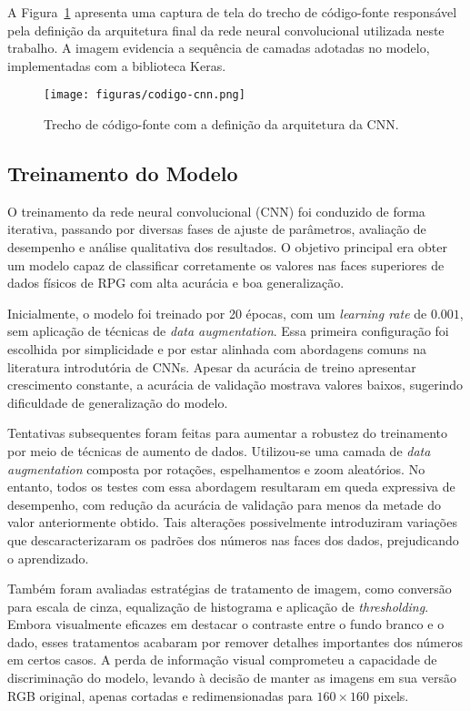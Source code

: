 A Figura~\ref{fig:codigo-cnn} apresenta uma captura de tela do trecho de código-fonte responsável 
pela definição da arquitetura final da rede neural convolucional utilizada neste trabalho. 
A imagem evidencia a sequência de camadas adotadas no modelo, implementadas com a biblioteca Keras.

\begin{figure}[H]
    \centering
    \texttt{[image: figuras/codigo-cnn.png]}
    \caption{Trecho de código-fonte com a definição da arquitetura da CNN.}
    \label{fig:codigo-cnn}
\end{figure}

\subsection{Treinamento do Modelo}

O treinamento da rede neural convolucional (CNN) foi conduzido de forma iterativa, passando por 
diversas fases de ajuste de parâmetros, avaliação de desempenho e análise qualitativa dos resultados. 
O objetivo principal era obter um modelo capaz de classificar corretamente os valores nas faces 
superiores de dados físicos de RPG com alta acurácia e boa generalização.

Inicialmente, o modelo foi treinado por 20 épocas, com um \textit{learning rate} de $0.001$, 
sem aplicação de técnicas de \textit{data augmentation}. Essa primeira configuração foi escolhida 
por simplicidade e por estar alinhada com abordagens comuns na literatura introdutória de CNNs.
Apesar da acurácia de treino apresentar crescimento constante, a acurácia de validação mostrava 
valores baixos, sugerindo dificuldade de generalização do modelo.

Tentativas subsequentes foram feitas para aumentar a robustez do treinamento por meio de técnicas 
de aumento de dados. Utilizou-se uma camada de \textit{data augmentation} composta por rotações, 
espelhamentos e zoom aleatórios. No entanto, todos os testes com essa abordagem resultaram em queda 
expressiva de desempenho, com redução da acurácia de validação para menos da metade do valor 
anteriormente obtido. Tais alterações possivelmente introduziram variações que descaracterizaram 
os padrões dos números nas faces dos dados, prejudicando o aprendizado.

Também foram avaliadas estratégias de tratamento de imagem, como conversão para escala de cinza, 
equalização de histograma e aplicação de \textit{thresholding}. Embora visualmente eficazes em 
destacar o contraste entre o fundo branco e o dado, esses tratamentos acabaram por remover detalhes 
importantes dos números em certos casos. A perda de informação visual comprometeu a capacidade de 
discriminação do modelo, levando à decisão de manter as imagens em sua versão RGB original, apenas 
cortadas e redimensionadas para $160 \times 160$ pixels.

